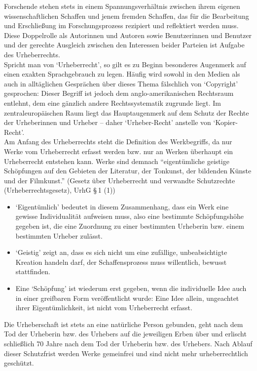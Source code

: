 \documentclass{article}
\begin{document}
    Forschende stehen stets in einem Spannungsverhältnis zwischen ihrem eigenen wissenschaftlichen Schaffen und jenem fremden Schaffen, das für die Bearbeitung und Erschließung im Forschungsprozess rezipiert und reflektiert werden muss. Diese Doppelrolle als Autorinnen und Autoren sowie Benutzerinnen und Benutzer und der gerechte Ausgleich zwischen den Interessen beider Parteien ist Aufgabe des Urheberrechts. \\
            
        Spricht man von ‘Urheberrecht’, so gilt es zu Beginn besonderes Augenmerk auf einen exakten Sprachgebrauch zu legen. Häufig wird sowohl in den Medien als auch in alltäglichen Gesprächen über dieses Thema fälschlich von ‘Copyright’ gesprochen: Dieser Begriff ist jedoch dem anglo-amerikanischen Rechtsraum entlehnt, dem eine gänzlich andere Rechtssystematik zugrunde liegt. Im zentraleuropäischen Raum liegt das Hauptaugenmerk auf dem Schutz der Rechte der Urheberinnen und Urheber – daher ‘Urheber-Recht’ anstelle von ‘Kopier-Recht’. \\
            
        Am Anfang des Urheberrechts steht die Definition des Werkbegriffs, da nur Werke vom Urheberrecht erfasst werden bzw. nur an Werken überhaupt ein Urheberrecht entstehen kann. Werke sind demnach “eigentümliche geistige Schöpfungen auf den Gebieten der Literatur, der Tonkunst, der bildenden Künste und der Filmkunst.” (Gesetz über Urheberrecht und verwandte Schutzrechte (Urheberrechtsgesetz), UrhG § 1 (1))\\
            
        \begin{itemize}\item {‘Eigentümlich’ bedeutet in diesem Zusammenhang, dass ein Werk eine gewisse Individualität aufweisen muss, also eine bestimmte Schöpfungshöhe gegeben ist, die eine Zuordnung zu einer bestimmten Urheberin bzw. einem bestimmten Urheber zulässt. }\item {‘Geistig’ zeigt an, dass es sich nicht um eine zufällige, unbeabsichtigte Kreation handeln darf, der Schaffensprozess muss willentlich, bewusst stattfinden. }\item {Eine ‘Schöpfung’ ist wiederum erst gegeben, wenn die individuelle Idee auch in einer greifbaren Form veröffentlicht wurde: Eine Idee allein, ungeachtet ihrer Eigentümlichkeit, ist nicht vom Urheberrecht erfasst.}\end{itemize}Die Urheberschaft ist stets an eine natürliche Person gebunden, geht nach dem Tod der Urheberin bzw. des Urhebers auf die jeweiligen Erben über und erlischt schließlich 70 Jahre nach dem Tod der Urheberin bzw. des Urhebers. Nach Ablauf dieser Schutzfrist werden Werke gemeinfrei und sind nicht mehr urheberrechtlich geschützt.\\
            
\end{document}

